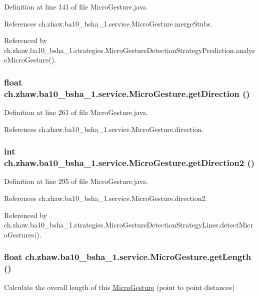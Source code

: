 Definition at line 141 of file MicroGesture.java.

References ch.zhaw.ba10\_\-bsha\_\-1.service.MicroGesture.mergeStubs.

Referenced by ch.zhaw.ba10\_\-bsha\_\-1.strategies.MicroGestureDetectionStrategyPrediction.analyseMicroGesture().\hypertarget{classch_1_1zhaw_1_1ba10__bsha__1_1_1service_1_1MicroGesture_a60d90eeae25a237c877d088da699874e}{
\subsubsection[{getDirection}]{\setlength{\rightskip}{0pt plus 5cm}float ch.zhaw.ba10\_\-bsha\_\-1.service.MicroGesture.getDirection ()}}
\label{classch_1_1zhaw_1_1ba10__bsha__1_1_1service_1_1MicroGesture_a60d90eeae25a237c877d088da699874e}


Definition at line 261 of file MicroGesture.java.

References ch.zhaw.ba10\_\-bsha\_\-1.service.MicroGesture.direction.\hypertarget{classch_1_1zhaw_1_1ba10__bsha__1_1_1service_1_1MicroGesture_a2e7fddf59ece8d2edc92d09cb739b98f}{
\subsubsection[{getDirection2}]{\setlength{\rightskip}{0pt plus 5cm}int ch.zhaw.ba10\_\-bsha\_\-1.service.MicroGesture.getDirection2 ()}}
\label{classch_1_1zhaw_1_1ba10__bsha__1_1_1service_1_1MicroGesture_a2e7fddf59ece8d2edc92d09cb739b98f}


Definition at line 295 of file MicroGesture.java.

References ch.zhaw.ba10\_\-bsha\_\-1.service.MicroGesture.direction2.

Referenced by ch.zhaw.ba10\_\-bsha\_\-1.strategies.MicroGestureDetectionStrategyLines.detectMicroGestures().\hypertarget{classch_1_1zhaw_1_1ba10__bsha__1_1_1service_1_1MicroGesture_ad2000095a1aaed409721b5580382639f}{
\subsubsection[{getLength}]{\setlength{\rightskip}{0pt plus 5cm}float ch.zhaw.ba10\_\-bsha\_\-1.service.MicroGesture.getLength ()}}
\label{classch_1_1zhaw_1_1ba10__bsha__1_1_1service_1_1MicroGesture_ad2000095a1aaed409721b5580382639f}
Calculate the overall length of this \hyperlink{classch_1_1zhaw_1_1ba10__bsha__1_1_1service_1_1MicroGesture}{MicroGesture} (point to point distances) 

